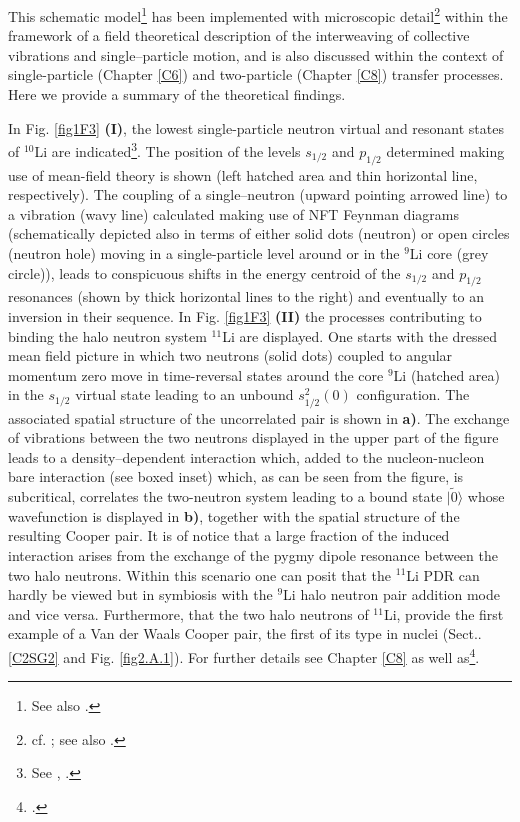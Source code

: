  
 
 This schematic model\footnote{See also \cite{Broglia:19b}.} has been implemented with microscopic detail\footnote{cf. \cite{Barranco:01}; see also \cite{Potel:10}.} within the framework of a field theoretical description of the interweaving of collective vibrations and single--particle motion, and is also discussed  within the context of single-particle (Chapter \ref{C6}) and two-particle (Chapter \ref{C8}) transfer processes. Here we provide a summary of the theoretical findings. 
 
 
 
 
 In Fig. \ref{fig1F3} \textbf{(I)}, the lowest single-particle neutron virtual and resonant states of  $^{10}$Li are indicated\footnote{See \cite{Barranco:20}, \cite{Moro:19}.}. The 
  position of the levels $s_{1/2}$ and $p_{1/2}$ determined making use
 of mean-field theory is shown (left hatched area and thin horizontal
 line, respectively). The coupling of a single--neutron (upward
 pointing arrowed line) to a vibration (wavy line) calculated
 making use of NFT Feynman diagrams 
 (schematically depicted also in terms of either solid dots (neutron)
 or open circles (neutron hole) moving in a single-particle
 level around or in the $^9$Li core (grey circle)), leads to conspicuous
 shifts in the energy centroid of the $s_{1/2}$ and $p_{1/2}$ resonances
 (shown by thick horizontal lines to the right) and eventually to
 an inversion in their sequence. In Fig. \ref{fig1F3} \textbf{(II)} the  processes contributing to  binding the  halo neutron system $^{11}$Li are displayed. One starts with the dressed mean  field
 picture in which two neutrons (solid dots) coupled to angular momentum zero move in
 time-reversal states around the core $^{9}$Li (hatched area) in the
 $s_{1/2}$ virtual state leading to an unbound $s^2
 _{1/2}(0)$ configuration.  The associated spatial structure of the uncorrelated pair is shown in \textbf{a)}. The exchange
 of vibrations between the two neutrons displayed in the upper
 part of the figure leads to a density--dependent interaction
 which, added to the nucleon-nucleon bare interaction (see boxed inset) which, as can be seen from the figure, is subcritical, correlates the
 two-neutron system leading to a bound state $|\tilde 0\rangle$ whose wavefunction is  displayed in \textbf{b)}, together with the spatial structure of the resulting Cooper pair. It is of notice that a large fraction of the induced interaction arises from the exchange of the pygmy dipole resonance between the two halo neutrons.  Within this scenario one can posit that the $^{11}$Li PDR  can hardly be viewed but in symbiosis with the $^{9}$Li halo neutron pair addition mode and vice versa. Furthermore, that the two halo neutrons of $^{11}$Li, provide the first example of a Van der Waals Cooper pair, the first of its type in nuclei (Sect.. \ref{C2SG2} and Fig. \ref{fig2.A.1}). For further details see Chapter \ref{C8} as well as\footnote{\cite{Barranco:01}.}.
 
